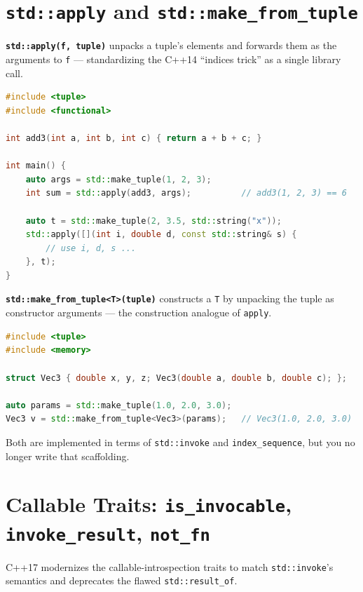 \section{\texttt{std::apply} and \texttt{std::make\_from\_tuple}}
\label{sec:c17-apply}

\textbf{\texttt{std::apply(f, tuple)}} unpacks a tuple's elements and forwards them as the arguments to \texttt{f} --- standardizing the C++14 ``indices trick'' as a single library call.

\begin{lstlisting}[language=C++,caption={std::apply replaces the hand-written index-sequence unpacker}]
#include <tuple>
#include <functional>

int add3(int a, int b, int c) { return a + b + c; }

int main() {
    auto args = std::make_tuple(1, 2, 3);
    int sum = std::apply(add3, args);          // add3(1, 2, 3) == 6

    auto t = std::make_tuple(2, 3.5, std::string("x"));
    std::apply([](int i, double d, const std::string& s) {
        // use i, d, s ...
    }, t);
}
\end{lstlisting}

\textbf{\texttt{std::make\_from\_tuple<T>(tuple)}} constructs a \texttt{T} by unpacking the tuple as constructor arguments --- the construction analogue of \texttt{apply}.

\begin{lstlisting}[language=C++,caption={Constructing an object from a tuple of arguments}]
#include <tuple>
#include <memory>

struct Vec3 { double x, y, z; Vec3(double a, double b, double c); };

auto params = std::make_tuple(1.0, 2.0, 3.0);
Vec3 v = std::make_from_tuple<Vec3>(params);   // Vec3(1.0, 2.0, 3.0)
\end{lstlisting}

Both are implemented in terms of \texttt{std::invoke} and \texttt{index\_sequence}, but you no longer write that scaffolding.

\section{Callable Traits: \texttt{is\_invocable}, \texttt{invoke\_result}, \texttt{not\_fn}}
\label{sec:c17-callable-traits}

C++17 modernizes the callable-introspection traits to match \texttt{std::invoke}'s semantics and deprecates the flawed \texttt{std::result\_of}.

